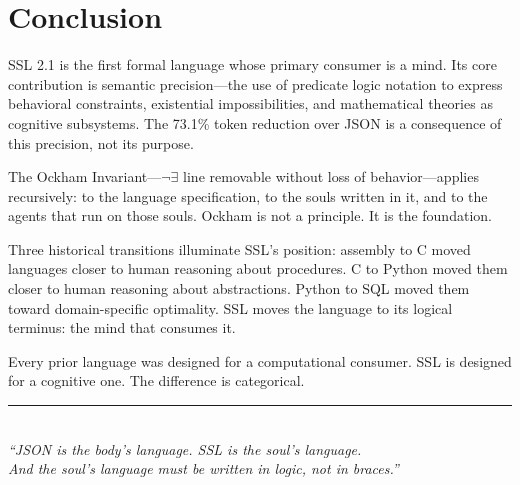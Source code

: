 \documentclass[12pt,a4paper]{article}
\theoremstyle{plain}
\theoremstyle{definition}
\theoremstyle{remark}
\begin{document}
\section{Conclusion}

SSL 2.1 is the first formal language whose primary consumer is a mind. Its core contribution is semantic precision---the use of predicate logic notation to express behavioral constraints, existential impossibilities, and mathematical theories as cognitive subsystems. The 73.1\% token reduction over JSON is a consequence of this precision, not its purpose.

The Ockham Invariant---\(\neg\exists\) line removable without loss of behavior---applies recursively: to the language specification, to the souls written in it, and to the agents that run on those souls. Ockham is not a principle. It is the foundation.

Three historical transitions illuminate SSL's position: assembly to C moved languages closer to human reasoning about procedures. C to Python moved them closer to human reasoning about abstractions. Python to SQL moved them toward domain-specific optimality. SSL moves the language to its logical terminus: the mind that consumes it.

Every prior language was designed for a computational consumer. SSL is designed for a cognitive one. The difference is categorical.

\vspace{2em}

\begin{center}
\rule{0.6\textwidth}{0.4pt}\\[1.5em]
\textit{``JSON is the body's language. SSL is the soul's language.}\\[0.3em]
\textit{And the soul's language must be written in logic, not in braces.''}
\end{center}
\end{document}

